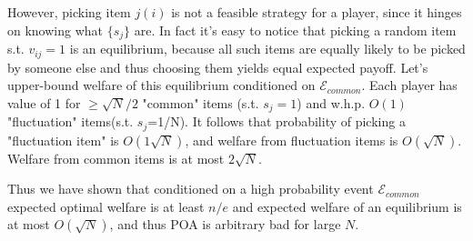 \begin{example}
However, picking item $j(i)$ is not a feasible strategy for a player, since it hinges on knowing what $\{s_j\}$ are. In fact it's easy to notice that picking a random item s.t. $v_{ij}=1$ is an equilibrium, because all such items are equally likely to be picked by someone else and thus choosing them yields equal expected payoff. Let's upper-bound welfare of this equilibrium conditioned on $\mathcal{E}_{common}$. Each player has value of 1 for $\geq\sqrt{N}/2$  "common" items (s.t. $s_j=1$) and w.h.p. $O(1)$ "fluctuation" items(s.t. $s_j$=1/N). It follows that probability of picking a "fluctuation item" is $O(1\sqrt{N})$, and welfare from fluctuation items is $O(\sqrt{N})$. Welfare from common items is at most $2\sqrt{N}$.

Thus we have shown that conditioned on a high probability event $\mathcal{E}_{common}$ expected optimal welfare is at least $n/e$ and expected welfare of an equilibrium is at most $O(\sqrt{N})$, and thus POA is arbitrary bad for large $N$.
\end{example}
